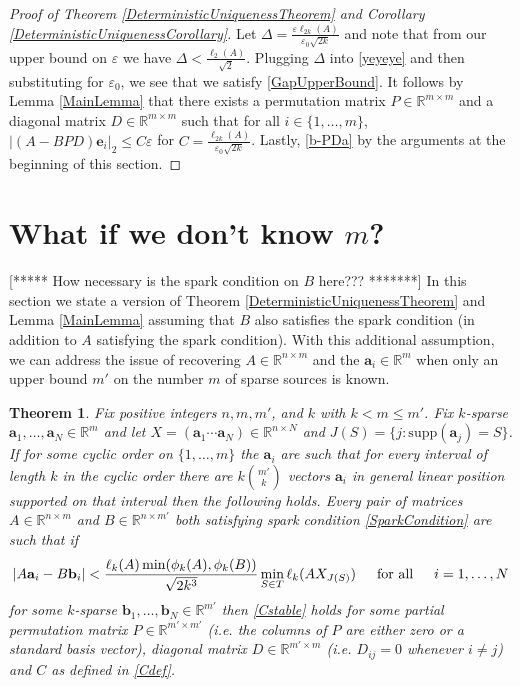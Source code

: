 \documentclass[journal, onecolumn]{IEEEtran}
\newtheorem{theorem}{Theorem}
\begin{document}
\begin{proof}[Proof of Theorem \ref{DeterministicUniquenessTheorem} and Corollary \ref{DeterministicUniquenessCorollary}]
Let $\Delta =  \frac{\varepsilon \ell_{2k}(A)}{\varepsilon_0 \sqrt{2k}}$ and note that from our upper bound on $\varepsilon$ we have $\Delta < \frac{\ell_2(A)}{\sqrt{2}}$. Plugging $\Delta$ into \eqref{yeyeye} and then substituting for $\varepsilon_0$, we see that we satisfy \eqref{GapUpperBound}. It follows by Lemma \ref{MainLemma} that there exists a permutation matrix $P \in \mathbb{R}^{m \times m}$ and a diagonal matrix $D \in \mathbb{R}^{m \times m}$ such that for all $i \in \{1, \ldots, m\}$,
$|(A - BPD)\mathbf{e}_i|_2 \leq C\varepsilon$ for $C = \frac{\ell_{2k}(A)}{\varepsilon_0\sqrt{2k}}$. Lastly, \eqref{b-PDa} by the arguments at the beginning of this section.
\end{proof}



\section{What if we don't know $m$?}\label{mleqm}

[***** How necessary is the spark condition on $B$ here??? *******]
In this section we state a version of Theorem \ref{DeterministicUniquenessTheorem} and Lemma \ref{MainLemma} assuming that $B$ also satisfies the spark condition (in addition to $A$ satisfying the spark condition). With this additional assumption, we can address the issue of recovering $A \in \mathbb{R}^{n \times m}$ and the $\mathbf{a}_i \in \mathbb{R}^m$ when only an upper bound $m'$ on the number $m$ of sparse sources is known.

\begin{theorem}\label{DeterministicUniquenessTheorem2}
Fix positive integers $n, m, m'$, and $k$ with $k < m \leq m'$. Fix $k$-sparse $\mathbf{a}_1, \ldots, \mathbf{a}_N \in \mathbb{R}^m$ and let $X  = (\mathbf{a}_1 \cdots \mathbf{a}_N) \in \mathbb{R}^{n \times N}$ and $J(S) = \{j : \text{supp}(\mathbf{a}_j) = S\}$. If for some cyclic order on $\{1, \ldots, m\}$ the $\mathbf{a}_i$ are such that for every interval of length $k$ in the cyclic order there are $k{m' \choose k}$ vectors $\mathbf{a}_i$ in general linear position supported on that interval then the following holds. Every pair of matrices $A \in \mathbb{R}^{n \times m}$ and $B \in \mathbb{R}^{n \times m'}$ both satisfying spark condition \eqref{SparkCondition} are such that if 
\begin{align}
|A\mathbf{a}_i - B\mathbf{b}_i| < \frac{ \ell_{k}(A) \min(\phi_k(A), \phi_k(B))}{\sqrt{2k^3} } \min_{S \in T} \ell_k(AX_{J(S)}) \indent \text{for all} \indent i = 1, \ldots, N
\end{align}
%
for some $k$-sparse $\mathbf{b}_1, \ldots, \mathbf{b}_N \in \mathbb{R}^{m'}$ then \eqref{Cstable} holds for some partial permutation matrix $P \in \mathbb{R}^{m' \times m'}$ (i.e. the columns of $P$ are either zero or a standard basis vector), diagonal matrix $D \in \mathbb{R}^{m' \times m}$ (i.e. $D_{ij} = 0$ whenever $i \neq j$) and $C$ as defined in \eqref{Cdef}. 
\end{theorem}
\end{document}
